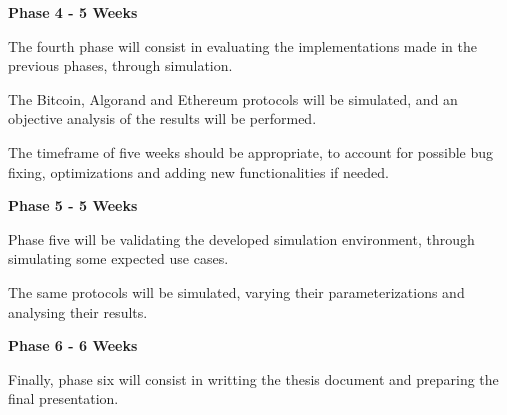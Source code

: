 \textbf{Phase 4 - 5 Weeks}

The fourth phase will consist in evaluating the implementations made in the previous phases, through simulation.

The Bitcoin, Algorand and Ethereum protocols will be simulated, and an objective analysis of the results will be performed.

The timeframe of five weeks should be appropriate, to account for possible bug fixing, optimizations and adding new functionalities if needed.

\vspace{0.5cm}

\textbf{Phase 5 - 5 Weeks}

Phase five will be validating the developed simulation environment, through simulating some expected use cases.

The same protocols will be simulated, varying their parameterizations and analysing their results.

\vspace{0.5cm}

\textbf{Phase 6 - 6 Weeks}

Finally, phase six will consist in writting the thesis document and preparing the final presentation.


